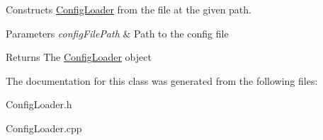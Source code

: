 Constructs \hyperlink{classConfigLoader}{Config\+Loader} from the file at the given path. 


\begin{DoxyParams}{Parameters}
{\em config\+File\+Path} & Path to the config file \\
\hline
\end{DoxyParams}
\begin{DoxyReturn}{Returns}
The \hyperlink{classConfigLoader}{Config\+Loader} object 
\end{DoxyReturn}


The documentation for this class was generated from the following files\+:\begin{DoxyCompactItemize}
\item 
Config\+Loader.\+h\item 
Config\+Loader.\+cpp\end{DoxyCompactItemize}
